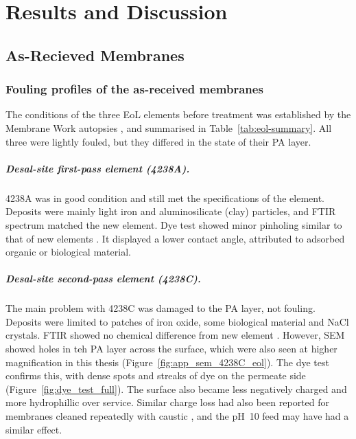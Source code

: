 \chapter{Results and Discussion}
\label{ch:results}

\section{As-Recieved Membranes}
\subsection{Fouling profiles of the as-received membranes}
\label{sec:res-fouling}
The conditions of the three EoL elements before treatment was established by the Membrane Work autopsies \citep{MembraneWorks2026Mine,MembraneWorks2025Desal}, and summarised in Table~\ref{tab:eol-summary}. All three were lightly fouled, but they differed in the state of their PA layer.

\paragraph{Desal-site first-pass element (4238A).}
\label{sec:red-fouling-4238A}
4238A was in good condition and still met the specifications of the element. Deposits were mainly light iron and aluminosilicate (clay) particles, and FTIR spectrum matched the new element. Dye test showed minor pinholing similar to that of new elements \citep{MembraneWorks2025Desal}. It displayed a lower contact angle, attributed to adsorbed organic or biological material. 

\paragraph{Desal-site second-pass element (4238C).}
\label{sec:res-fouling-4238C}
The main problem with 4238C was damaged to the PA layer, not fouling. Deposits were limited to patches of iron oxide, some biological material and NaCl crystals. FTIR showed no chemical difference from new element \citep{MembraneWorks2025Desal}. However, SEM showed holes in teh PA layer across the surface, which were also seen at higher magnification in this thesis (Figure~\ref{fig:app_sem_4238C_eol}). The dye test confirms this, with dense spots and streaks of dye on the permeate side (Figure~\ref{fig:dye_test_full}). The surface also became less negatively charged and more hydrophillic over service. Similar charge loss had also been reported for membranes cleaned repeatedly with caustic \citep{MembraneWorks2025Desal}, and the pH~10 feed may have had a similar effect.


